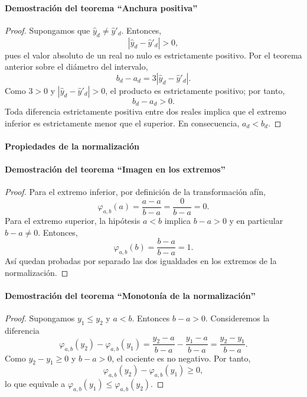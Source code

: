 \documentclass[12pt]{report} %
\begin{document}
\paragraph*{Demostración del teorema ``Anchura positiva''}
\begin{proof}
    Supongamos que $\hat{y}_d \neq \hat{y}'_d$. Entonces,
    $$|\hat{y}_d - \hat{y}'_d| > 0,$$
    pues el valor absoluto de un real no nulo es estrictamente positivo. Por el teorema anterior sobre el diámetro del intervalo,
    $$b_d - a_d = 3|\hat{y}_d - \hat{y}'_d|.$$
    Como $3 > 0$ y $|\hat{y}_d - \hat{y}'_d| > 0$, el producto es estrictamente positivo; por tanto,
    $$b_d - a_d > 0.$$
    Toda diferencia estrictamente positiva entre dos reales implica que el extremo inferior es estrictamente menor que el superior. En consecuencia, $a_d < b_d$.
\end{proof}

\paragraph*{Propiedades de la normalización}

\paragraph*{Demostración del teorema ``Imagen en los extremos''}
\begin{proof}
    Para el extremo inferior, por definición de la transformación afín,
    $$\varphi_{a,b}(a) = \frac{a-a}{b-a} = \frac{0}{b-a} = 0.$$
    Para el extremo superior, la hipótesis $a < b$ implica $b-a > 0$ y en particular $b-a \neq 0$. Entonces,
    $$\varphi_{a,b}(b) = \frac{b-a}{b-a} = 1.$$
    Así quedan probadas por separado las dos igualdades en los extremos de la normalización.
\end{proof}

\paragraph*{Demostración del teorema ``Monotonía de la normalización''}
\begin{proof}
    Supongamos $y_1 \le y_2$ y $a < b$. Entonces $b-a > 0$. Consideremos la diferencia
    $$\varphi_{a,b}(y_2) - \varphi_{a,b}(y_1)
        = \frac{y_2-a}{b-a} - \frac{y_1-a}{b-a}
        = \frac{y_2-y_1}{b-a}.$$
    Como $y_2-y_1 \ge 0$ y $b-a > 0$, el cociente es no negativo. Por tanto,
    $$\varphi_{a,b}(y_2) - \varphi_{a,b}(y_1) \ge 0,$$
    lo que equivale a $\varphi_{a,b}(y_1) \le \varphi_{a,b}(y_2)$.
\end{proof}
\end{document}
